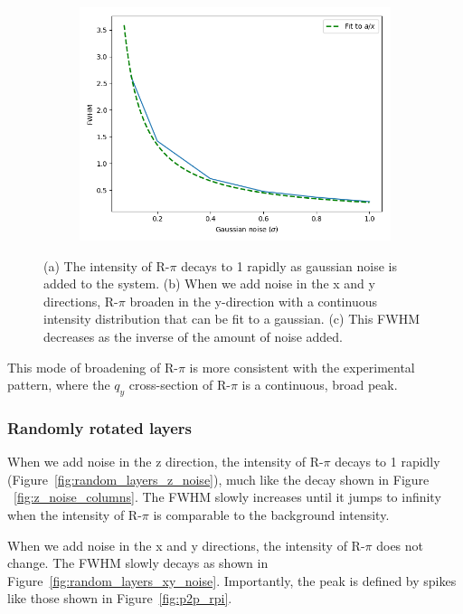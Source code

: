 \documentclass{article}
\begin{document}
\begin{figure}[!htb]
\begin{subfigure}{0.32\textwidth}
  \caption{}\label{fig:FWHM_fit_columns}
  \end{subfigure}
  \begin{subfigure}{0.32\textwidth}
  \includegraphics[width=\textwidth]{random_columns_xy_noise.png}
  \caption{}\label{fig:FWHM_columns}
  \end{subfigure}
  \caption{(a) The intensity of R-$\pi$ decays to 1 rapidly as gaussian noise is 
   added to the system. (b) When we add noise in the x and y directions, R-$\pi$
   broaden in the y-direction with a continuous intensity distribution that can be
   fit to a gaussian. (c) This FWHM decreases as the inverse of the amount of 
   noise added.}\label{fig:columns_noise}
  \end{figure}

  This mode of broadening of R-$\pi$ is more consistent with the experimental
  pattern, where the $q_y$ cross-section of R-$\pi$ is a continuous, broad peak. 

  \subsubsection{Randomly rotated layers}

  When we add noise in the z direction, the intensity of R-$\pi$ decays to 1
  rapidly (Figure~\ref{fig:random_layers_z_noise}), much like the decay shown in
  Figure ~\ref{fig:z_noise_columns}. The FWHM slowly increases until it jumps to
  infinity when the intensity of R-$\pi$ is comparable to the background
  intensity.

  When we add noise in the x and y directions, the intensity of R-$\pi$ does
  not change. The FWHM slowly decays as shown in
  Figure~\ref{fig:random_layers_xy_noise}. Importantly, the peak is defined by
  spikes like those shown in Figure~\ref{fig:p2p_rpi}.
\end{document}

